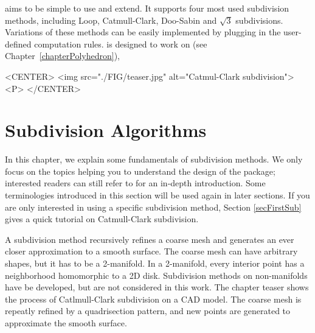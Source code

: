 
 aims to be simple to use and extend.
It supports four most used subdivision methods, including Loop, 
Catmull-Clark, Doo-Sabin and $\sqrt{3}$ subdivisions. Variations 
of these methods can be easily implemented by plugging 
in the user-defined computation rules. 
is designed to work on  
(see Chapter~\ref{chapterPolyhedron}), 


\begin{ccHtmlOnly}
     <CENTER>
         <img src="./FIG/teaser.jpg" alt="Catmul-Clark subdivision"><P>
     </CENTER>
\end{ccHtmlOnly}

\section{Subdivision Algorithms}
\label{secSubAlgo}
In this chapter, we explain some fundamentals of 
subdivision methods. We only focus on the topics helping you 
to understand the design of the package; interested readers can
still refer to \cite{cgal:ww-smgd-02} for an in-depth introduction.
Some terminologies introduced in this section will be used again
in later sections. If you are only interested in using a 
specific subdivision method, Section \ref{secFirstSub} 
gives a quick tutorial on Catmull-Clark subdivision.

A subdivision method recursively refines a coarse mesh and 
generates an ever closer approximation to a smooth surface.
The coarse mesh can have arbitrary shapes, but it has to 
be a 2-manifold. In a 2-manifold, every interior point has 
a neighborhood homomorphic to a 2D disk. Subdivision methods
on non-manifolds have be developed, but are not considered
in this work. 
The chapter teaser shows the process of Catlmull-Clark 
subdivision on a CAD model. The coarse mesh is repeatly refined 
by a quadrisection pattern, and new points are generated 
to approximate the smooth surface.

